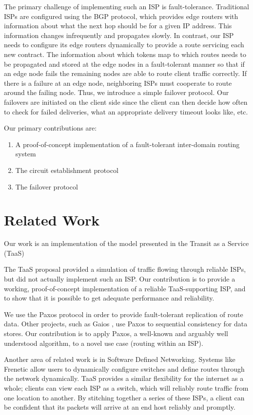 \documentclass{article}
\begin{document}
The primary challenge of implementing such an ISP is
fault-tolerance. Traditional ISPs are configured using the BGP
protocol, which provides edge routers with information about what the
next hop should be for a given IP address. This information changes
infrequently and propagates slowly. In contrast, our ISP needs to
configure its edge routers dynamically to provide a route servicing
each new contract. The information about which tokens map to which
routes needs to be propagated and stored at the edge nodes in a
fault-tolerant manner so that if an edge node fails the remaining
nodes are able to route client traffic correctly. If there is a
failure at an edge node, neighboring ISPs must cooperate to route
around the failing node. Thus, we introduce a simple failover
protocol. Our failovers are initiated on the client side since the
client can then decide how often to check for failed deliveries, what
an appropriate delivery timeout looks like, etc.

Our primary contributions are:
\begin{enumerate}
\item A proof-of-concept implementation of a fault-tolerant
  inter-domain routing system
\item The circuit establishment protocol
\item The failover protocol
\end{enumerate}

\section{Related Work}
Our work is an implementation of the model presented in the Transit as
a Service (TaaS)

The TaaS proposal \cite{taas} provided a simulation of
traffic flowing through reliable ISPs, but did not actually implement
such an ISP. Our contribution is to provide a working,
proof-of-concept implementation of a reliable TaaS-supporting ISP, and
to show that it is possible to get adequate performance and
reliability.

We use the Paxos protocol \cite{paxos} in order to provide
fault-tolerant replication of route data. Other projects, such as
Gaios \cite{gaios}, use Paxos to sequential consistency for data
stores. Our contribution is to apply Paxos, a well-known and arguably
well understood algorithm, to a novel use case (routing within an
ISP).

Another area of related work is in Software Defined
Networking. Systems like Frenetic \cite{frenetic} allow users to
dynamically configure switches and define routes through the network
dynamically. TaaS provides a similar flexibility for the internet as a
whole; clients can view each ISP as a switch, which will reliably
route traffic from one location to another. By stitching together a
series of these ISPs, a client can be confident that its packets will
arrive at an end host reliably and promptly.
\end{document}
